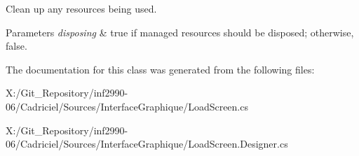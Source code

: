 Clean up any resources being used. 


\begin{DoxyParams}{Parameters}
{\em disposing} & true if managed resources should be disposed; otherwise, false.\\
\hline
\end{DoxyParams}


The documentation for this class was generated from the following files\-:\begin{DoxyCompactItemize}
\item 
X\-:/\-Git\-\_\-\-Repository/inf2990-\/06/\-Cadriciel/\-Sources/\-Interface\-Graphique/Load\-Screen.\-cs\item 
X\-:/\-Git\-\_\-\-Repository/inf2990-\/06/\-Cadriciel/\-Sources/\-Interface\-Graphique/Load\-Screen.\-Designer.\-cs\end{DoxyCompactItemize}
